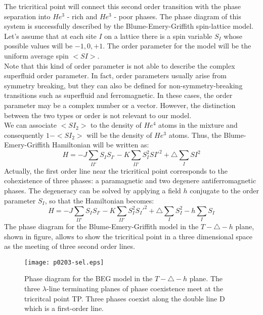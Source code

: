 \documentclass[a4paper,11pt, notitlepage]{report}
\begin{document}
The tricritical point will connect this second order transition with the phase separation into $He^3$ - rich and $He^3$ - poor phases. 
The phase diagram of this system is successfully described by the Blume-Emery-Griffith spin-lattice model. Let's assume that at each site $I$ on a lattice there is a spin variable $S_I$ whose possible values will be $-1,0,+1$. The order parameter for the model will be the uniform average spin $<SI>$. \\
Note that this kind of order parameter is not able to describe the complex superfluid order parameter. In fact, order parameters usually arise from symmetry breaking, but they can also be defined for non-symmetry-breaking transitions such as superfluid and ferromagnetic. In these cases, the order parameter may be a complex number or a vector. However, the distinction between the two types or order is not relevant to our model.\\
We can associate $<SI_2>$ to the density of $He^4$ atoms in the mixture and consequently $1 - <SI_2>$ will be the density of $He^3$ atoms. Thus, the Blume-Emery-Griffith Hamiltonian will be written as:
\begin{equation}
H = - J \sum_{II'} S_IS_{I'} - K \sum_{II'} S_I^2SI'^2 + \triangle \sum_I SI^2
\end{equation}
Actually, the first order line near the tricritical point corresponds to the cohexistence of three phases: a paramagnetic and two degenere antiferromagnetic phases. The degeneracy can be solved by applying a field $h$ conjugate to the order parameter $S_I$, so that the Hamiltonian becomes:
\begin{equation}
H = - J \sum_{II'} S_IS_{I'} - K\sum_{II'} S_I^2S_I'^2 + \triangle \sum_I S_I^2 - h \sum_I S_I 
\end{equation}
The phase diagram for the Blume-Emery-Griffith model in the $T - \triangle - h$ plane, shown in figure, allows to show the tricritical point in a three dimensional space as the meeting of three second order lines. \\  

\begin{figure}
\begin{center}
\texttt{[image: p0203-sel.eps]}
\end{center}
\caption{Phase diagram for the BEG model in the $T - \triangle - h$ plane. The three $\lambda$-line terminating planes of phase coexistence meet at the tricritcal point TP. Three phases coexist along the double line D which is a first-order line.}
\label{fig:dessin}
\end{figure}
\end{document}
